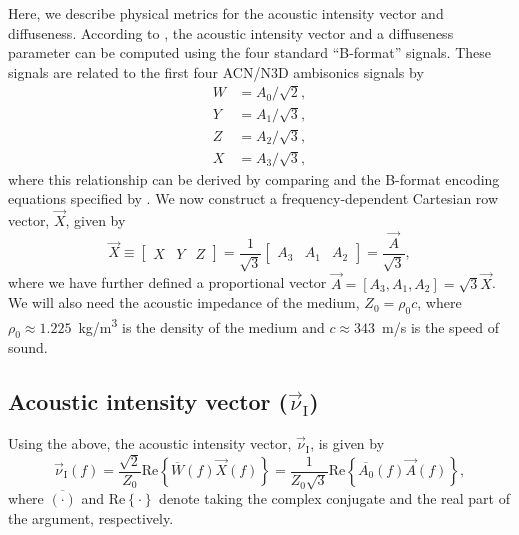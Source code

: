 Here, we describe physical metrics for the acoustic intensity vector and diffuseness.
According to \citet{MerimaaPulkki2005}, the acoustic intensity vector and a diffuseness parameter can be computed using the four standard ``B-format'' signals.
These signals are related to the first four ACN/N3D ambisonics signals by
\begin{equation}
\begin{split}
W &= A_0 / \sqrt{2}, \\
Y &= A_1 / \sqrt{3}, \\
Z &= A_2 / \sqrt{3}, \\
X &= A_3 / \sqrt{3},
\end{split}
\end{equation}
where this relationship can be derived by comparing  and the B-format encoding equations specified by \citet[p.~62]{MalhamMyatt1995}.
We now construct a frequency-dependent Cartesian row vector, $\vec{X}$, given by
\begin{equation}
\vec{X} \equiv \begin{bmatrix} X & Y & Z \end{bmatrix} = \frac{1}{\sqrt{3}} \begin{bmatrix} A_3 & A_1 & A_2 \end{bmatrix} = \frac{\vec{A}}{\sqrt{3}},
\end{equation}
where we have further defined a proportional vector $\vec{A} = \left[ A_3, A_1, A_2 \right] = \sqrt{3} \vec{X}$.
We will also need the acoustic impedance of the medium, $Z_0 = \rho_0 c$, where $\rho_0 \approx 1.225$~kg/m\textsuperscript{3} is the density of the medium and $c \approx 343$~m/s is the speed of sound.

\subsection{Acoustic intensity vector (\texorpdfstring{$\vec{\nu}_{\text{I}}$}{vI})}\label{sec:04_Auditory_Models:Intensity_Vector}
Using the above, the acoustic intensity vector, $\vec{\nu}_{\textrm{I}}$, is given by \citep[Eq.~(11)]{MerimaaPulkki2005}
\begin{equation}\label{eq:04_Auditory_Models:Intensity_Vector}
\vec{\nu}_{\textrm{I}}(f) = \frac{\sqrt{2}}{Z_0} \text{Re} \left\{ \overline{W}(f) \vec{X}(f) \right\} = \frac{1}{{Z_0 \sqrt{3}}} \text{Re} \left\{ \overline{A_0}(f) \vec{A}(f) \right\},
\end{equation}
where $\overline{(\cdot)}$ and $\text{Re} \left\{ \cdot \right\}$ denote taking the complex conjugate and the real part of the argument, respectively.

